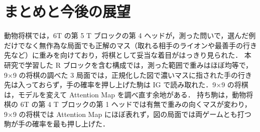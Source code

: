 \documentclass[submit]{ipsj}
\begin{document}
\section{まとめと今後の展望}
動物将棋では，6T の第 5 T ブロックの第 4 ヘッドが，測った問いで，選んだ例だけでなく無作為な局面でも正解のマス（取れる相手のライオンや最善手の行き先など）に重みを向けており，将棋として妥当な着目がはっきり見られた．
本研究で学習した R ブロックを含む構成では，測った範囲で重みはほぼ均等で，9×9 の将棋の調べた 3 局面では，正規化した図で濃いマスに指された手の行き先は入っておらず，手の確率を押し上げた駒は IG で読み取れた．9×9 の将棋は，モデルを変えて Attention Map を調べ直す余地がある．
持ち駒は，動物将棋の 6T の第 4 T ブロックの第 1 ヘッドでは有無で重みの向くマスが変わり，9×9 の将棋では Attention Map にほぼ表れず，図の局面では両ゲームとも打つ駒が手の確率を最も押し上げた．
\end{document}

